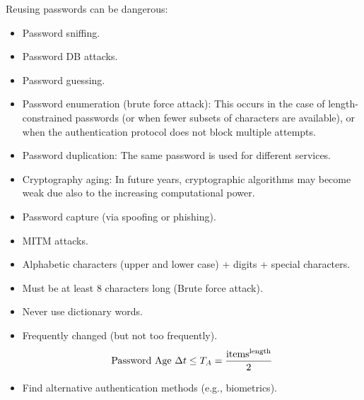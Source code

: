 \clearpage
\begin{multicols}{2}
    Reusing passwords can be dangerous:
    \begin{itemize}
        \item Password sniffing.
        \item Password DB attacks.
        \item Password guessing.
        \item Password enumeration (brute force attack): This occurs in the case of length-constrained passwords (or when fewer subsets of characters are available), or when the authentication protocol does not block multiple attempts.
        \item Password duplication: The same password is used for different services.
        \item Cryptography aging: In future years, cryptographic algorithms may become weak due also to the increasing computational power.
        \item Password capture (via spoofing or phishing).
        \item MITM attacks.
    \end{itemize}
    \columnbreak

    \begin{itemize}
        \item Alphabetic characters (upper and lower case) + digits + special characters.
        \item Must be at least 8 characters long (Brute force attack).
        \item Never use dictionary words.
        \item Frequently changed (but not too frequently).
        \[ \text{Password Age } \Delta t \le T_A =  {\text{items}^{\text{length}} \over 2}  \]
        \item Find alternative authentication methods (e.g., biometrics).
    \end{itemize}
    
\end{multicols}

